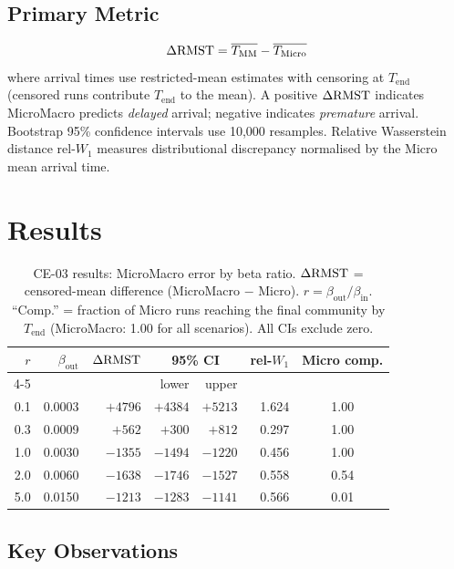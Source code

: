 \documentclass[11pt,a4paper]{article}
\begin{document}
\subsection{Primary Metric}
\[
  \Delta\mathrm{RMST} = \overline{T_{\text{MM}}} - \overline{T_{\text{Micro}}}
\]
where arrival times use restricted-mean estimates with censoring at
$T_{\text{end}}$ (censored runs contribute $T_{\text{end}}$ to the mean).
A positive $\Delta\mathrm{RMST}$ indicates MicroMacro predicts \emph{delayed} arrival;
negative indicates \emph{premature} arrival.
Bootstrap 95\% confidence intervals use 10{,}000 resamples.
Relative Wasserstein distance $\text{rel-}W_1$ measures distributional
discrepancy normalised by the Micro mean arrival time.

\section{Results}

\begin{table}[H]
\centering
\caption{CE-03 results: MicroMacro error by beta ratio.
  $\Delta\mathrm{RMST}$ = censored-mean difference (MicroMacro $-$ Micro).
  $r = \beta_{\text{out}}/\beta_{\text{in}}$.
  ``Comp.'' = fraction of Micro runs reaching the final community
  by $T_{\text{end}}$ (MicroMacro: 1.00 for all scenarios).
  All CIs exclude zero.}
\label{tab:ce03-main}
\begin{tabular}{rrrrrrc}
\toprule
$r$ & $\beta_{\text{out}}$ & $\Delta\mathrm{RMST}$ & \multicolumn{2}{c}{95\% CI} & rel-$W_1$ & Micro comp. \\
\cmidrule(lr){4-5}
 & & & lower & upper & & \\
\midrule
0.1 & 0.0003 & $+4796$ & $+4384$ & $+5213$ & 1.624 & 1.00 \\
0.3 & 0.0009 & $+562$  & $+300$  & $+812$  & 0.297 & 1.00 \\
1.0 & 0.0030 & $-1355$ & $-1494$ & $-1220$ & 0.456 & 1.00 \\
2.0 & 0.0060 & $-1638$ & $-1746$ & $-1527$ & 0.558 & 0.54 \\
5.0 & 0.0150 & $-1213$ & $-1283$ & $-1141$ & 0.566 & 0.01 \\
\bottomrule
\end{tabular}
\end{table}

\subsection{Key Observations}
\end{document}
